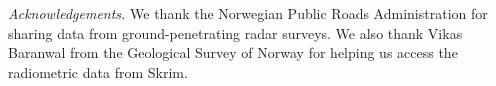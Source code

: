 \documentclass[soil, manuscript]{copernicus}
\begin{document}
\begin{acknowledgements}
\emph{Acknowledgements.} We thank the Norwegian Public Roads Administration for sharing data from ground-penetrating radar surveys. We also thank Vikas Baranwal from the Geological Survey of Norway for helping us access the radiometric data from Skrim.
\end{acknowledgements}







\end{document}
